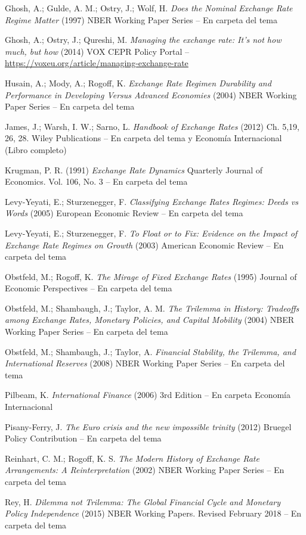 \documentclass{nuevotema}
\begin{document}
Ghosh, A.; Gulde, A. M.; Ostry, J.; Wolf, H. \textit{Does the Nominal Exchange Rate Regime Matter} (1997) NBER Working Paper Series -- En carpeta del tema

Ghosh, A.; Ostry, J.; Qureshi, M. \textit{Managing the exchange rate: It's not how much, but how} (2014) VOX CEPR Policy Portal -- \url{https://voxeu.org/article/managing-exchange-rate}

Husain, A.; Mody, A.; Rogoff, K. \textit{Exchange Rate Regimen Durability and Performance in Developing Versus Advanced Economies} (2004) NBER Working Paper Series -- En carpeta del tema

James, J.; Warsh, I. W.; Sarno, L. \textit{Handbook of Exchange Rates} (2012) Ch. 5,19, 26, 28. Wiley Publications -- En carpeta del tema y Economía Internacional (Libro completo)

Krugman, P. R. (1991) \textit{Exchange Rate Dynamics} Quarterly Journal of Economics. Vol. 106, No. 3 -- En carpeta del tema

Levy-Yeyati, E.; Sturzenegger, F. \textit{Classifying Exchange Rates Regimes: Deeds vs Words} (2005) European Economic Review -- En carpeta del tema

Levy-Yeyati, E.; Sturzenegger, F. \textit{To Float or to Fix: Evidence on the Impact of Exchange Rate Regimes on Growth} (2003) American Economic Review -- En carpeta del tema

Obstfeld, M.; Rogoff, K. \textit{The Mirage of Fixed Exchange Rates} (1995) Journal of Economic Perspectives -- En carpeta del tema

Obstfeld, M.; Shambaugh, J.; Taylor, A. M. \textit{The Trilemma in History: Tradeoffs among Exchange Rates, Monetary Policies, and Capital Mobility} (2004) NBER Working Paper Series -- En carpeta del tema

Obstfeld, M.; Shambaugh, J.; Taylor, A. \textit{Financial Stability, the Trilemma, and International Reserves} (2008) NBER Working Paper Series -- En carpeta del tema

Pilbeam, K. \textit{International Finance} (2006) 3rd Edition -- En carpeta Economía Internacional

Pisany-Ferry, J. \textit{The Euro crisis and the new impossible trinity} (2012) Bruegel Policy Contribution -- En carpeta del tema


Reinhart, C. M.; Rogoff, K. S. \textit{The Modern History of Exchange Rate Arrangements: A Reinterpretation} (2002) NBER Working Paper Series -- En carpeta del tema

Rey, H. \textit{Dilemma not Trilemma: The Global Financial Cycle and Monetary Policy Independence} (2015) NBER Working Papers. Revised February 2018 -- En carpeta del tema
\end{document}

